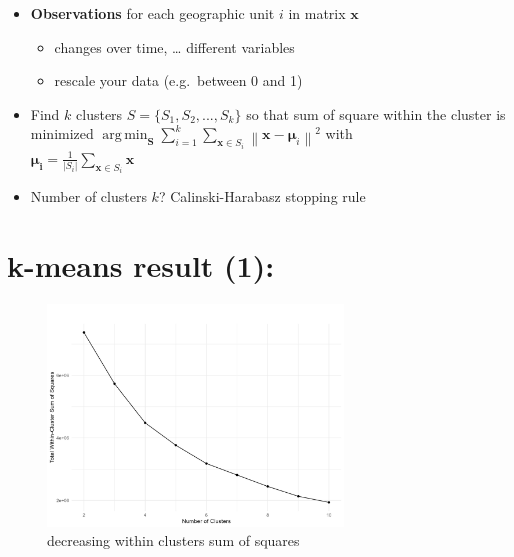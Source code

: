 \documentclass[
  letterpaper,
  DIV=11,
  numbers=noendperiod]{scrartcl}
\providecommand{\tightlist}{%
  \setlength{\itemsep}{0pt}\setlength{\parskip}{0pt}}\usepackage{longtable,booktabs,array}
\begin{document}
\begin{itemize}
\tightlist
\item
  \textbf{Observations} for each geographic unit \(i\) in matrix
  \(\mathbf {x}\)

  \begin{itemize}
  \tightlist
  \item
    changes over time, \ldots{} different variables
  \item
    rescale your data (e.g.~between 0 and 1)
  \end{itemize}
\item
  Find \(k\) clusters \(S = \{S_{1}, S_{2}, ..., S_{k}\}\) so that sum
  of square within the cluster is minimized
  \(\displaystyle \mathop {\operatorname {arg\,min} } _{\mathbf {S} }\sum _{i=1}^{k}\sum _{\mathbf {x} \in S_{i}}\left\|\mathbf {x} -{\boldsymbol {\mu }}_{i}\right\|^{2}\)
  with\\
  \(\boldsymbol {\mu _{i}}={\frac {1}{|S_{i}|}}\sum_{\mathbf {x} \in S_{i}}\mathbf {x}\)
\item
  Number of clusters \(k\)? Calinski-Harabasz stopping rule
\end{itemize}

\hypertarget{k-means-result-1}{%
\section{k-means result (1):}\label{k-means-result-1}}

\begin{figure}

{\centering \includegraphics[width=0.7\textwidth,height=\textheight]{imgs/elbow_plot.png}

}

\caption{decreasing within clusters sum of squares}

\end{figure}
\end{document}
